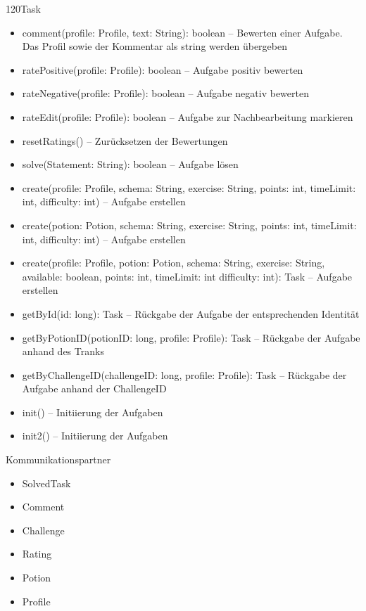 \begin{class}{120}{Task}
\begin{itemize}
\item comment(profile: Profile, text: String): boolean -- Bewerten einer Aufgabe. Das Profil sowie der Kommentar als string werden übergeben
\item ratePositive(profile: Profile): boolean -- Aufgabe positiv bewerten
\item rateNegative(profile: Profile): boolean -- Aufgabe negativ bewerten
\item rateEdit(profile: Profile): boolean -- Aufgabe zur Nachbearbeitung markieren
\item resetRatings() -- Zurücksetzen der Bewertungen
\item solve(Statement: String): boolean -- Aufgabe lösen
\item create(profile: Profile, schema: String, exercise: String, points: int, timeLimit: int, difficulty: int) -- Aufgabe erstellen
\item create(potion: Potion, schema: String, exercise: String, points: int, timeLimit: int, difficulty: int) -- Aufgabe erstellen
\item create(profile: Profile, potion: Potion, schema: String, exercise: String, available: boolean, points: int, timeLimit: int difficulty: int): Task -- Aufgabe erstellen
\item getById(id: long): Task -- Rückgabe der Aufgabe der entsprechenden Identität
\item getByPotionID(potionID: long, profile: Profile): Task -- Rückgabe der Aufgabe anhand des Tranks
\item getByChallengeID(challengeID: long,  profile: Profile): Task -- Rückgabe der Aufgabe anhand der ChallengeID
\item init() -- Initiierung der Aufgaben
\item init2() -- Initiierung der Aufgaben
\end{itemize}
\item[Kommunikationspartner]~\\
\begin{itemize}
\item SolvedTask
\item Comment
\item Challenge
\item Rating
\item Potion
\item Profile
\end{itemize}
\end{class}

